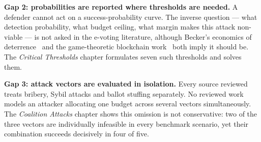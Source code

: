 \textbf{Gap 2: probabilities are reported where thresholds are
needed.} A defender cannot act on a success-probability curve. The
inverse question --- what detection probability, what budget ceiling,
what margin makes this attack non-viable --- is not asked in the
e-voting literature, although Becker's economics of
deterrence~\cite{becker1968} and the game-theoretic blockchain
work~\cite{eyal2014,liu2019} both imply it should be.
The \emph{Critical Thresholds} chapter formulates seven such thresholds and solves them.

\textbf{Gap 3: attack vectors are evaluated in isolation.} Every source
reviewed treats bribery, Sybil attacks and ballot stuffing separately.
No reviewed work models an attacker allocating one budget across
several vectors simultaneously. The \emph{Coalition Attacks} chapter shows this omission is not conservative: two of the three vectors are individually
infeasible in every benchmark scenario, yet their combination succeeds
decisively in four of five.
